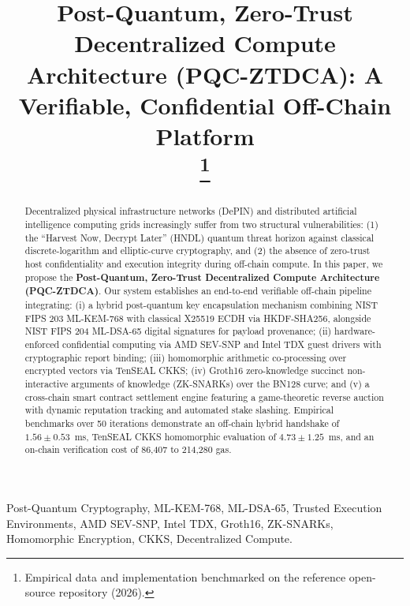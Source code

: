 \documentclass[conference]{IEEEtran}
\begin{document}
\title{Post-Quantum, Zero-Trust Decentralized Compute Architecture (PQC-ZTDCA): A Verifiable, Confidential Off-Chain Platform\\
\thanks{Empirical data and implementation benchmarked on the reference open-source repository (2026).}
}

\author{
}

\maketitle

\begin{abstract}
Decentralized physical infrastructure networks (DePIN) and distributed artificial intelligence computing grids increasingly suffer from two structural vulnerabilities: (1) the ``Harvest Now, Decrypt Later'' (HNDL) quantum threat horizon against classical discrete-logarithm and elliptic-curve cryptography, and (2) the absence of zero-trust host confidentiality and execution integrity during off-chain compute. In this paper, we propose the \textbf{Post-Quantum, Zero-Trust Decentralized Compute Architecture (PQC-ZTDCA)}. Our system establishes an end-to-end verifiable off-chain pipeline integrating: (i) a hybrid post-quantum key encapsulation mechanism combining NIST FIPS 203 ML-KEM-768 with classical X25519 ECDH via HKDF-SHA256, alongside NIST FIPS 204 ML-DSA-65 digital signatures for payload provenance; (ii) hardware-enforced confidential computing via AMD SEV-SNP and Intel TDX guest drivers with cryptographic report binding; (iii) homomorphic arithmetic co-processing over encrypted vectors via TenSEAL CKKS; (iv) Groth16 zero-knowledge succinct non-interactive arguments of knowledge (ZK-SNARKs) over the BN128 curve; and (v) a cross-chain smart contract settlement engine featuring a game-theoretic reverse auction with dynamic reputation tracking and automated stake slashing. Empirical benchmarks over 50 iterations demonstrate an off-chain hybrid handshake of $1.56\pm0.53$~ms, TenSEAL CKKS homomorphic evaluation of $4.73\pm1.25$~ms, and an on-chain verification cost of 86,407 to 214,280 gas.
\end{abstract}

\begin{IEEEkeywords}
Post-Quantum Cryptography, ML-KEM-768, ML-DSA-65, Trusted Execution Environments, AMD SEV-SNP, Intel TDX, Groth16, ZK-SNARKs, Homomorphic Encryption, CKKS, Decentralized Compute.
\end{IEEEkeywords}
\end{document}
